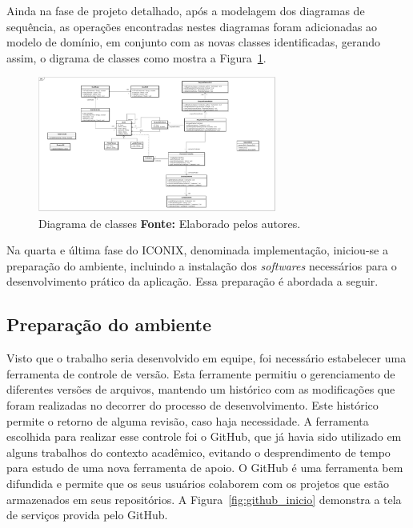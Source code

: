 \par Ainda na fase de projeto detalhado, após a modelagem dos diagramas de sequência, as operações encontradas nestes diagramas foram adicionadas ao modelo de domínio, em conjunto com as novas classes identificadas, gerando assim, o digrama de classes como mostra a Figura~\ref{fig:diagrama_classe}.

\begin{figure}[h!]
	\centerline{\includegraphics[angle=90,height=0.7\textheight,width=0.7\textwidth]{./imagens/classe.jpg}}
	\caption[Diagrama de classes]
	{Diagrama de classes \textbf{Fonte:} Elaborado pelos autores.}
	\label{fig:diagrama_classe}
\end{figure}

\newpage
\par Na quarta e última fase do ICONIX, denominada implementação, iniciou-se a preparação do ambiente, incluindo a instalação dos \textit{softwares} necessários para o desenvolvimento prático da aplicação. Essa preparação é abordada a seguir.

\subsection{Preparação do ambiente}

\par Visto que o trabalho seria desenvolvido em equipe, foi necessário estabelecer uma ferramenta de controle de versão. Esta ferramente permitiu o gerenciamento de diferentes versões de arquivos, mantendo um histórico com as modificações que foram realizadas no decorrer do processo de desenvolvimento. Este histórico permite o retorno de alguma revisão, caso haja necessidade. A ferramenta escolhida para realizar esse controle foi o GitHub, que já havia sido utilizado em alguns trabalhos do contexto acadêmico, evitando o desprendimento de tempo para estudo de uma nova ferramenta de apoio. O GitHub é uma ferramenta bem difundida e permite que os seus usuários colaborem com os projetos que estão armazenados em seus repositórios\footnotemark[31]. A Figura~\ref{fig:github_inicio} demonstra a tela de serviços provida pelo GitHub.

